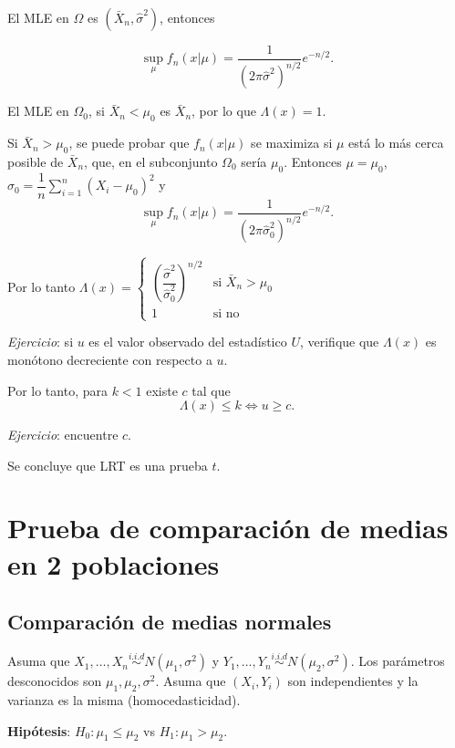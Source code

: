 \documentclass[
  12pt,
]{book}
\begin{document}
El MLE en \(\Omega\) es \((\bar X_n,\hat\sigma^2)\), entonces

\[\sup_{\mu}f_n(x|\mu) = \dfrac1{(2\pi\hat\sigma^2)^{n/2}}e^{-n/2}.\]

El MLE en \(\Omega_0\), si \(\bar X_n<\mu_0\) es \(\bar X_n\), por lo que \(\Lambda(x) =1\).

Si \(\bar X_n>\mu_0\), se puede probar que \(f_n(x|\mu)\) se maximiza si \(\mu\) está lo más cerca posible de \(\bar X_n\), que, en el subconjunto \(\Omega_0\) sería \(\mu_0\). Entonces \(\mu = \mu_0\), \(\hat\sigma_0 = \dfrac 1n \sum_{i=1}^n(X_i-\mu_0)^2\) y
\[\sup_{\mu}f_n(x|\mu) = \dfrac1{(2\pi\hat\sigma_0^2)^{n/2}}e^{-n/2}.\]

Por lo tanto
\(\Lambda(x) = \begin{cases}\left(\dfrac{\hat \sigma^2}{\hat\sigma_0^2}\right)^{n/2}& \text{si }\bar X_n>\mu_0\\ 1 & \text{si no}\end{cases}\)

\emph{Ejercicio}: si \(u\) es el valor observado del estadístico \(U\), verifique que \(\Lambda(x)\) es monótono decreciente con respecto a \(u\).

Por lo tanto, para \(k<1\) existe \(c\) tal que
\[\Lambda(x) \leq k \Leftrightarrow u\geq c.\]

\emph{Ejercicio}: encuentre \(c\).

Se concluye que LRT es una prueba \(t\).

\hypertarget{prueba-de-comparaciuxf3n-de-medias-en-2-poblaciones}{%
\chapter{Prueba de comparación de medias en 2 poblaciones}\label{prueba-de-comparaciuxf3n-de-medias-en-2-poblaciones}}

\hypertarget{comparaciuxf3n-de-medias-normales}{%
\section{Comparación de medias normales}\label{comparaciuxf3n-de-medias-normales}}

Asuma que \(X_1,\dots, X_n\overset{i.i.d}{\sim} N(\mu_1,\sigma^2)\) y \(Y_1,\dots, Y_n\overset{i.i.d}{\sim} N(\mu_2,\sigma^2)\). Los parámetros desconocidos son \(\mu_1,\mu_2,\sigma^2\). Asuma que \((X_i,Y_i)\) son independientes y la varianza es la misma (homocedasticidad).

\textbf{Hipótesis}: \(H_0: \mu_1\leq\mu_2\) vs \(H_1: \mu_1>\mu_2\).
\end{document}
